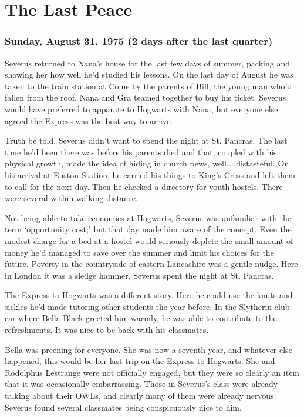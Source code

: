 
\chapter{The Last Peace}

\subsection{Sunday, August 31, 1975 (2 days after the last quarter)}

Severus returned to Nana's house for the last few days of summer, packing and showing her how well he'd studied his lessons. On the last day of August he was taken to the train station at Colne by the parents of Bill, the young man who'd fallen from the roof. Nana and Gra teamed together to buy his ticket. Severus would have preferred to apparate to Hogwarts with Nana, but everyone else agreed the Express was the best way to arrive.

Truth be told, Severus didn't want to spend the night at St. Pancras. The last time he'd been there was before his parents died and that, coupled with his physical growth, made the idea of hiding in church pews, well... distasteful. On his arrival at Euston Station, he carried his things to King's Cross and left them to call for the next day. Then he checked a directory for youth hostels. There were several within walking distance.

Not being able to take economics at Hogwarts, Severus was unfamiliar with the term `opportunity cost,' but that day made him aware of the concept. Even the modest charge for a bed at a hostel would seriously deplete the small amount of money he'd managed to save over the summer and limit his choices for the future. Poverty in the countryside of eastern Lancashire was a gentle nudge. Here in London it was a sledge hammer. Severus spent the night at St. Pancras.

The Express to Hogwarts was a different story. Here he could use the knuts and sickles he'd made tutoring other students the year before. In the Slytherin club car where Bella Black greeted him warmly, he was able to contribute to the refreshments. It was nice to be back with his classmates.

Bella was preening for everyone. She was now a seventh year, and whatever else happened, this would be her last trip on the Express to Hogwarts. She and Rodolphus Lestrange were not officially engaged, but they were so clearly an item that it was occasionally embarrassing. Those in Severus's class were already talking about their OWLs, and clearly many of them were already nervous. Severus found several classmates being conspicuously nice to him.

